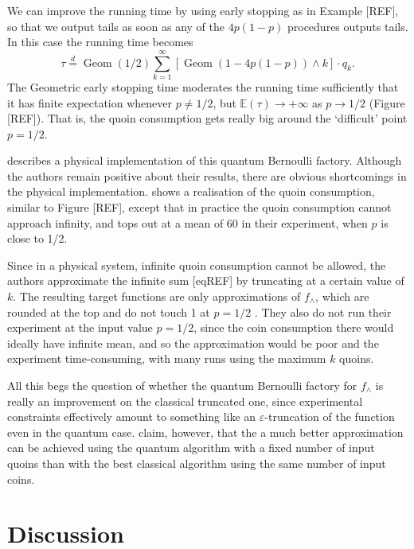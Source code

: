 \documentclass{article}
\theoremstyle{definition}
\newenvironment{example}
  {\pushQED{\qed}\renewcommand{\qedsymbol}{$\triangle$}\examplex}
  {\popQED\endexamplex}
\newcommand{\E}{\mathbb{E}}
\newcommand{\eqdist}{\overset{d}{=}}
\newcommand{\Geom}{\operatorname{Geom}}
\begin{document}
\begin{example}
We can improve the running time by using early stopping as in Example [REF], so that we output tails as soon as any of the $4p(1-p)$ procedures outputs tails. In this case the running time becomes 
\begin{equation*}
\tau \eqdist \Geom(1/2) \sum_{k=1}^\infty [\Geom(1-4p(1-p)) \wedge k] \cdot q_k.
\end{equation*} %
The Geometric early stopping time moderates the running time sufficiently that it has finite expectation whenever $p\neq 1/2$, but $\E(\tau) \to +\infty$ as $p\to 1/2$ (Figure [REF]). That is, the quoin consumption gets really big around the `difficult' point $p=1/2$.

\citet{patel2018} describes a physical implementation of this quantum Bernoulli factory. Although the authors remain positive about their results, there are obvious shortcomings in the physical implementation. \citet[Figure 3e]{patel2018} shows a realisation of the quoin consumption, similar to Figure [REF], except that in practice the quoin consumption cannot approach infinity, and tops out at a mean of 60 in their experiment, when $p$ is close to 1/2.

Since in a physical system, infinite quoin consumption cannot be allowed, the authors approximate the infinite sum [eqREF] by truncating at a certain value of $k$. The resulting target functions are only approximations of $f_\wedge$, which are rounded at the top and do not touch 1 at $p=1/2$ \citep[Figures 3a--d]{patel2018}. They also do not run their experiment at the input value $p=1/2$, since the coin consumption there would ideally have infinite mean, and so the approximation would be poor and the experiment time-consuming, with many runs using the maximum $k$ quoins.

All this begs the question of whether the quantum Bernoulli factory for $f_\wedge$ is really an improvement on the classical truncated one, since experimental constraints effectively amount to something like an $\varepsilon$-truncation of the function even in the quantum case.
\citet{patel2018} claim, however, that the a much better approximation can be achieved using the quantum algorithm with a fixed number of input quoins than with the best classical algorithm using the same number of input coins.
\end{example}





\section{Discussion}\label{sec:discussion}
% 


\end{document}
